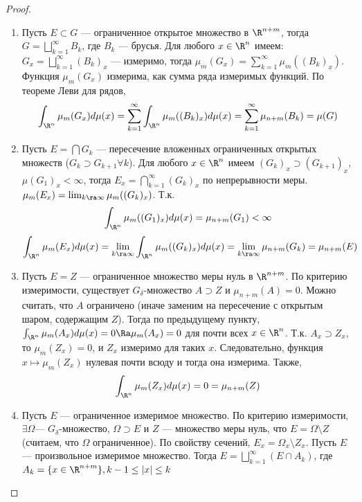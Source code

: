 \begin{proof}
\begin{enumerate}
        \item Пусть \(E \subset G\) --- ограниченное открытое множество в \(\R^{n + m}\), тогда \(G = \bigsqcup_{k = 1}^\infty B_k\), где \(B_k\) --- брусья. Для любого \(x \in \R^n\) имеем: \(G_x = \bigsqcup_{k = 1}^\infty (B_k)_x\) --- измеримо, тогда \(\mu_m(G_x) = \sum_{k = 1}^\infty \mu_m((B_k)_x)\). Функция \(\mu_m(G_x)\) измерима, как сумма ряда измеримых функций. По теореме Леви для рядов, 
        \[\int_{\R^n} \mu_m(G_x)d\mu(x) = \sum_{k = 1}^\infty \int_{\R^n}\mu_m((B_k)_x)d\mu(x) = \sum_{k = 1}^\infty \mu_{n + m}(B_k) = \mu(G)\]
        \item Пусть \(E = \bigcap G_k\) --- пересечение вложенных ограниченных открытых множеств (\(G_k \supset G_{k + 1} \forall k\)). Для любого \(x \in \R^n\) имеем \((G_k)_x \supset (G_{k + 1})_x\), \(\mu(G_1)_x < \infty\), тогда \(E_x = \bigcap_{k = 1}^\infty(G_k)_x\) по непрерывности меры. \(\mu_m(E_x) = \lim_{k \ra \infty}\mu_m((G_k)_x)\). Т.к. 
        \[\int_{\R^n} \mu_m((G_1)_x)d\mu(x) = \mu_{n + m}(G_1) < \infty\]
        \[\int_{\R^n}\mu_m(E_x)d\mu(x) = \lim_{k \ra \infty} \int_{\R^n} \mu_m((G_k)_x)d\mu(x) = \lim_{k \ra \infty} \mu_{n + m}(G_k) = \mu_{n + m}(E)\]
        \item Пусть \(E = Z\) --- ограниченное множество меры нуль в \(\R^{n + m}\). По критерию измеримости, существует \(G_\delta\)-множество \(A \supset Z\) и \(\mu_{n + m}(A) = 0\). Можно считать, что \(A\) ограничено (иначе заменим на пересечение с открытым шаром, содержащим \(Z\)). Тогда по предыдущему пункту, \(\int_{\R^n} \mu_m(A_x)d\mu(x) = 0 \Ra \mu_m(A_x) = 0\) для почти всех \(x \in \R^n\). Т.к. \(A_x \supset Z_x\), то \(\mu_m(Z_x) = 0\), и \(Z_x\) измеримо для таких \(x\). Следовательно, функция \(x \mapsto \mu_m(Z_x)\) нулевая почти всюду и тогда она измерима. Также, \[\int_{\R^n} \mu_m(Z_x) d\mu(x) = 0 = \mu_{n + m}(Z)\] 
        \item Пусть \(E\) --- ограниченное измеримое множество. По критерию измеримости, \(\exists \Omega\)--- \(G_\delta\)-множество, \(\Omega \supset E\) и \(Z\) --- множество меры нуль, что \(E = \Omega \setminus Z\) (считаем, что \(\Omega\) ограниченное). По свойству сечений, \(E_x = \Omega_x \setminus Z_x\). Пусть \(E\) --- произвольное измеримое множество. Тогда \(E = \bigsqcup_{k = 1}^\infty (E \cap A_k)\), где \(A_k = \{x \in \R^{n + m}\}, k - 1 \le |x| \le k\)
    \end{enumerate}
\end{proof}

